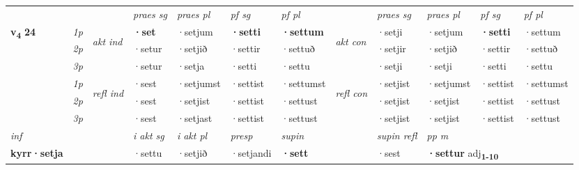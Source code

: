 \begin{longtable}[l]{X>{\footnotesize\itshape}llXXXXlXXXX}
 & &   & \textit{praes sg}  & \textit{praes pl}    & \textit{ pf sg} & \textit{pf pl} & & \textit{praes sg}  & \textit{praes pl}    & \textit{pf sg} & \textit{pf pl }  \\ \cmidrule{4-7} \cmidrule{9-12}
 \multirow{2}{*}{{{\textbf{v{\textsubscript{4}}} \Large{\textbf{24}}}}}  & 1p & \multirow{3}{*}{\begin{turn}{90}\textit{akt ind}\end{turn}} & \textbf{·set} & ·setjum & \textbf{·setti} & \textbf{·settum} & \multirow{3}{*}{\begin{turn}{90}\textit{akt con}\end{turn}} &·setji & ·setjum & \textbf{·setti} & ·settum\\*
 & 2p &  &  ·setur  & ·setjið & ·settir & ·settuð & & ·setjir & ·setjið & ·settir & ·settuð \\*
 & 3p &  & ·setur & ·setja & ·setti & ·settu & & ·setji & ·setji& ·setti & ·settu \\*
\cmidrule{4-7} \cmidrule{9-12}
 & 1p & \multirow{3}{*}{\begin{turn}{90}\textit{refl ind}\end{turn}}  & ·sest & ·setjumst & ·settist & ·settumst & \multirow{3}{*}{\begin{turn}{90}\textit{refl con}\end{turn}}  &·setjist & ·setjumst & ·settist & ·settumst \\*
 & 2p &  & ·sest & ·setjist & ·settist & ·settust & &·setjist & ·setjist & ·settist & ·settust \\*
 & 3p  & & ·sest & ·setjast & ·settist & ·settust & & ·setjist & ·setjist& ·settist & ·settust \\*
\cmidrule{4-7} \cmidrule{9-12}

   {\textit{inf}} & &  & \textit{i akt sg} & \textit{i akt pl}   & \textit{presp} & \textit{supin} && \textit{supin refl} & \textit{pp m} \\*
  {\textbf{kyrr\allowbreak ·setja}} & && ·settu  & ·setjið   & ·setjandi &  \textbf{·sett} && ·sest & \multicolumn{2}{l}{\textbf{·settur} adj\textbf{\textsubscript{1-10}}} \\*

\midrule


\end{longtable}
